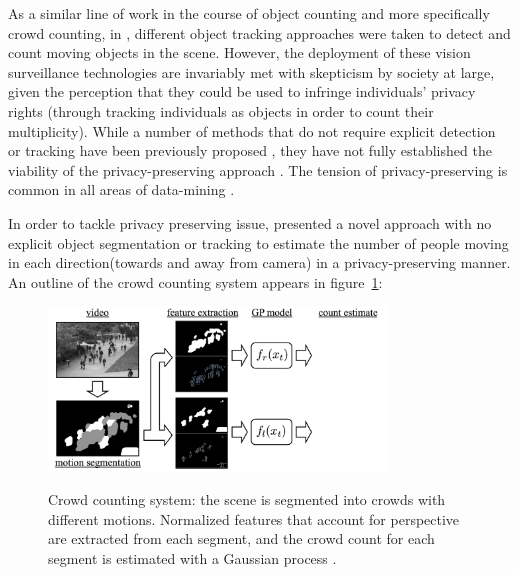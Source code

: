 \indent As a similar line of work in the course of object counting and more specifically crowd counting, in \cite{rabaud2006counting, brostow2006unsupervised, leibe2007coupled}, different object tracking approaches were taken to detect and count moving objects in the scene. However, the deployment of these vision surveillance technologies are invariably met with skepticism by society at large, given the perception that they could be used to infringe individuals' privacy rights (through tracking individuals as objects in order to count their multiplicity). While a number of methods that do not require explicit detection or tracking have been previously proposed \cite{paragios2001mrf, cho1999neural, regazzoni1996distributed, davies1995crowd, kong2005counting, marana1998efficacy, dong2007fast}, they have not fully established the viability of the privacy-preserving approach \cite{chan2008privacy}. The tension of privacy-preserving is common in all areas of data-mining \cite{vaidya2006privacy, verykios2004state}. 

In order to tackle privacy preserving issue, \citealt*{chan2008privacy} presented a novel approach with no explicit object segmentation or tracking to estimate the number of people moving in each direction(towards and away from camera) in a privacy-preserving manner. An outline of the crowd counting system appears in figure~\ref{fig:ucsd}:
\begin{figure}[H]
	\centering
	{\includegraphics[width=0.8\textwidth]{images/ucsdOutline}}
	\caption{Crowd counting system: the scene is segmented into crowds with different motions. Normalized features that account for perspective are extracted from each segment, and the crowd count for each segment is estimated with a Gaussian process \cite{chan2008privacy}.}
	\label{fig:ucsd}
\end{figure}

